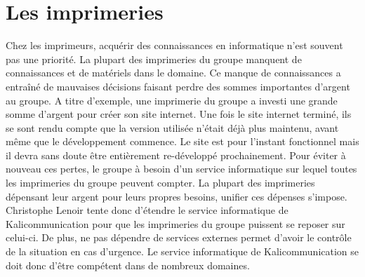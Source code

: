 
\section{Les imprimeries}
Chez les imprimeurs, acquérir des connaissances en informatique n'est souvent pas une priorité. La plupart des imprimeries du groupe manquent de connaissances et de matériels dans le domaine. Ce manque de connaissances a entraîné de mauvaises décisions faisant perdre des sommes importantes d'argent au groupe.\newline
A titre d'exemple, une imprimerie du groupe a investi une grande somme d'argent pour créer son site internet. Une fois le site internet terminé, ils se sont rendu compte que la version utilisée n'était déjà plus maintenu, avant même que le développement commence. Le site est pour l'instant fonctionnel mais il devra sans doute être entièrement re-développé prochainement.\newline
Pour éviter à nouveau ces pertes, le groupe à besoin d'un service informatique sur lequel toutes les imprimeries du groupe peuvent compter. La plupart des imprimeries dépensant leur argent pour leurs propres besoins, unifier ces dépenses s'impose. Christophe Lenoir tente donc d'étendre le service informatique de Kalicommunication pour que les imprimeries du groupe puissent se reposer sur celui-ci. De plus, ne pas dépendre de services externes permet d'avoir le contrôle de la situation en cas d'urgence. Le service informatique de Kalicommunication se doit donc d'être compétent dans de nombreux domaines.

